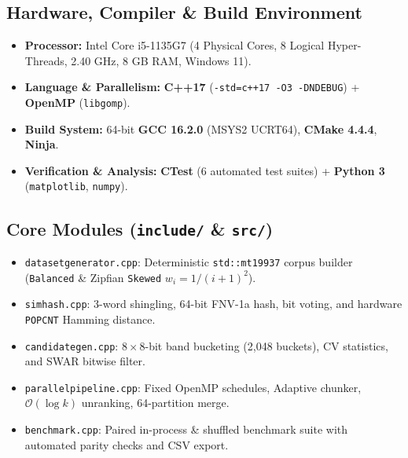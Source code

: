 \documentclass[10pt,a4paper]{article}
\renewcommand{\_}{\textunderscore\allowbreak}
\begin{document}
\begin{minipage}[t]{0.47\textwidth}
\raggedright
\subsection*{Hardware, Compiler \& Build Environment}
\footnotesize
\begin{itemize}[leftmargin=1.2em]
    \item \textbf{Processor:} Intel Core i5-1135G7 (4 Physical Cores, 8 Logical Hyper-Threads, 2.40 GHz, 8 GB RAM, Windows 11).
    \item \textbf{Language \& Parallelism:} \textbf{C++17} (\texttt{-std=c++17 -O3 -DNDEBUG}) + \textbf{OpenMP} (\texttt{libgomp}).
    \item \textbf{Build System:} 64-bit \textbf{GCC 16.2.0} (MSYS2 UCRT64), \textbf{CMake 4.4.4}, \textbf{Ninja}.
    \item \textbf{Verification \& Analysis:} \textbf{CTest} (6 automated test suites) + \textbf{Python 3} (\texttt{matplotlib}, \texttt{numpy}).
\end{itemize}
\end{minipage}\hfill
\begin{minipage}[t]{0.50\textwidth}
\raggedright
\subsection*{Core Modules (\texttt{include/} \& \texttt{src/})}
\footnotesize
\begin{itemize}[leftmargin=1.2em]
    \item \texttt{dataset\_generator.cpp}: Deterministic \texttt{std::mt19937\_64} corpus builder (\texttt{Balanced} \& Zipfian \texttt{Skewed} $w_i = 1/(i+1)^2$).
    \item \texttt{simhash.cpp}: 3-word shingling, 64-bit FNV-1a hash, bit voting, and hardware \texttt{POPCNT} Hamming distance.
    \item \texttt{candidate\_gen.cpp}: $8\times 8$-bit band bucketing (2,048 buckets), $\text{CV}$ statistics, and SWAR bitwise filter.
    \item \texttt{parallel\_pipeline.cpp}: Fixed OpenMP schedules, Adaptive chunker, $\mathcal{O}(\log k)$ unranking, 64-partition merge.
    \item \texttt{benchmark.cpp}: Paired in-process \& shuffled benchmark suite with automated parity checks and CSV export.
\end{itemize}
\end{minipage}
\end{document}
